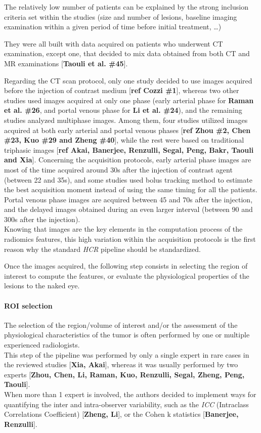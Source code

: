 \documentclass[]{article}
\let\oldparagraph\paragraph
\renewcommand{\paragraph}[1]{\oldparagraph{#1}\mbox{}}
\begin{document}
The relatively low number of patients can be explained by the strong
inclusion criteria set within the studies (size and number of lesions,
baseline imaging examination within a given period of time before
initial treatment, \ldots{})

They were all built with data acquired on patients who underwent CT
examination, except one, that decided to mix data obtained from both CT
and MR examinations {[}\textbf{Taouli et al. \#45}{]}.

Regarding the CT scan protocol, only one study decided to use images
acquired before the injection of contrast medium {[}\textbf{ref Cozzi
\#1}{]}, whereas two other studies used images acquired at only one
phase (early arterial phase for \textbf{Raman et al. \#26}, and portal
venous phase for \textbf{Li et al. \#24}), and the remaining studies
analyzed multiphase images. Among them, four studies utilized images
acquired at both early arterial and portal venous phases {[}\textbf{ref
Zhou \#2, Chen \#23, Kuo \#29 and Zheng \#40}{]}, while the rest were
based on traditional triphasic images {[}\textbf{ref Akai, Banerjee,
Renzulli, Segal, Peng, Bakr, Taouli and Xia}{]}. Concerning the
acquisition protocols, early arterial phase images are most of the time
acquired around 30s after the injection of contrast agent (between 22
and 35s), and some studies used bolus tracking method to estimate the
best acquisition moment instead of using the same timing for all the
patients. Portal venous phase images are acquired between 45 and 70s
after the injection, and the delayed images obtained during an even
larger interval (between 90 and 300s after the injection).\\
Knowing that images are the key elements in the computation process of
the radiomics features, this high variation within the acquisition
protocols is the first reason why the standard \emph{HCR} pipeline
should be standardized.

Once the images acquired, the following step consists in selecting the
region of interest to compute the features, or evaluate the
physiological properties of the lesions to the naked eye.

\paragraph{ROI selection}\label{roi-selection}

The selection of the region/volume of interest and/or the assessment of
the physiological characteristics of the tumor is often performed by one
or multiple experienced radiologists.\\
This step of the pipeline was performed by only a single expert in rare
cases in the reviewed studies {[}\textbf{Xia, Akai}{]}, whereas it was
usually performed by two experts {[}\textbf{Zhou, Chen, Li, Raman, Kuo,
Renzulli, Segal, Zheng, Peng, Taouli}{]}.\\
When more than 1 expert is involved, the authors decided to implement
ways for quantifying the inter and intra-observer variability, such as
the \emph{ICC} (Intraclass Correlations Coefficient) {[}\textbf{Zheng,
Li}{]}, or the Cohen k statistics {[}\textbf{Banerjee, Renzulli}{]}.
\end{document}
